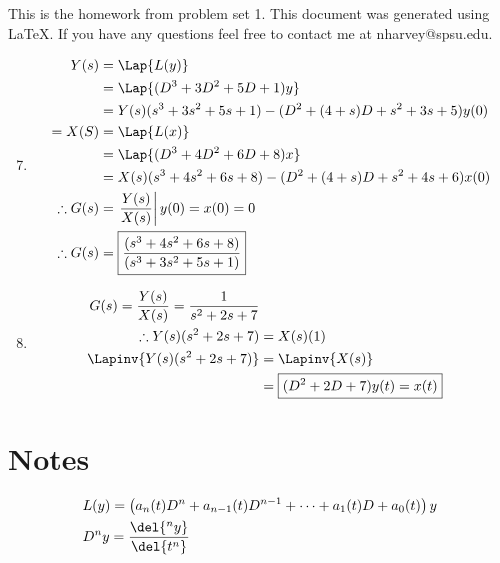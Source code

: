 \documentclass[main.tex]{subfiles}
\begin{document}
This is the homework from problem set 1. This document was generated using
\LaTeX. If you have any questions feel free to contact me at nharvey@spsu.edu.

\begin{enumerate}
	\setcounter{enumi}{6}
	\item
		\begin{align*}
			   Y(s) &= \Lap{L(y)}
			\\ &= \Lap{(D^3+3D^2+5D+1)y}
			\\ &= Y(s)(s^3+3s^2+5s+1)-(D^2+(4+s)D+s^2+3s+5)y(0)
			\\ = X(S) &= \Lap{L(x)}
			\\ &= \Lap{(D^3+4D^2+6D+8)x}
			\\ &= X(s)(s^3+4s^2+6s+8)-(D^2+(4+s)D+s^2+4s+6)x(0)
			\\ \therefore G(s) &= \left. \frac{Y(s)}{X(s)} \right| y(0)=x(0)=0
			\\ \therefore G(s) &= \boxed{\frac{(s^3+4s^2+6s+8)}{(s^3+3s^2+5s+1)}}
		\end{align*}
	\item
		\begin{align*}
			   G(s) = \frac{Y(s)}{X(s)} = \frac{1}{s^2+2s+7}
			\\ \therefore Y(s)(s^2+2s+7) &= X(s)(1)
			\\ \Lapinv{Y(s)(s^2+2s+7)} &= \Lapinv{X(s)}
			\\ &= \boxed{(D^2+2D+7)y(t) = x(t)}
		\end{align*}
\end{enumerate}

\section*{Notes} 
\label{sec:notes}
	\begin{align*}
		  & L(y) = \left(a_n(t)D^n + a_{n-1}(t)D^{n-1} + \cdots + a_1(t)D + a_0(t) \right)y
		\\& D^{n}y = \frac{\del{^ny}}{\del{t^n}}
	\end{align*}
\end{document}
